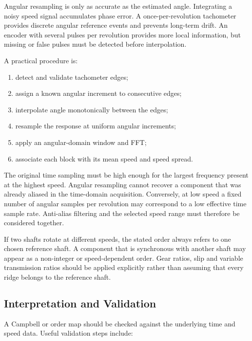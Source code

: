 Angular resampling is only as accurate as the estimated angle. Integrating a
noisy speed signal accumulates phase error. A once-per-revolution tachometer
provides discrete angular reference events and prevents long-term drift. An
encoder with several pulses per revolution provides more local information, but
missing or false pulses must be detected before interpolation.

A practical procedure is:

\begin{enumerate}
    \item detect and validate tachometer edges;
    \item assign a known angular increment to consecutive edges;
    \item interpolate angle monotonically between the edges;
    \item resample the response at uniform angular increments;
    \item apply an angular-domain window and FFT;
    \item associate each block with its mean speed and speed spread.
\end{enumerate}

The original time sampling must be high enough for the largest frequency present
at the highest speed. Angular resampling cannot recover a component that was
already aliased in the time-domain acquisition. Conversely, at low speed a fixed
number of angular samples per revolution may correspond to a low effective time
sample rate. Anti-alias filtering and the selected speed range must therefore be
considered together.

If two shafts rotate at different speeds, the stated order always refers to one
chosen reference shaft. A component that is synchronous with another shaft may
appear as a non-integer or speed-dependent order. Gear ratios, slip and variable
transmission ratios should be applied explicitly rather than assuming that every
ridge belongs to the reference shaft.

\subsection{Interpretation and Validation}

A Campbell or order map should be checked against the underlying time and speed
data. Useful validation steps include:

